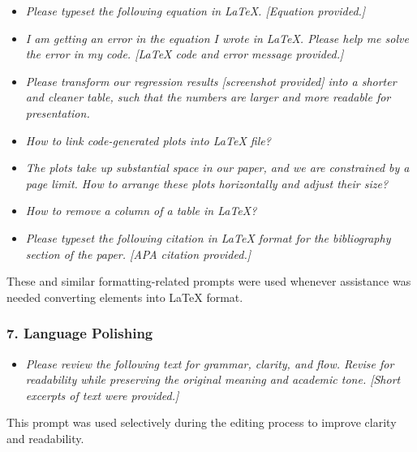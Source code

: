 \documentclass[12pt, a4paper]{article}
\begin{document}
\begin{itemize}
\item \textit{Please typeset the following equation in LaTeX. [Equation provided.]}

\item \textit{I am getting an error in the equation I wrote in LaTeX. Please help me solve the error in my code. [LaTeX code and error message provided.]}

\item \textit{Please transform our regression results [screenshot provided] into a shorter and cleaner table, such that the numbers are larger and more readable for presentation.}

\item \textit{How to link code-generated plots into LaTeX file?}

\item \textit{The plots take up substantial space in our paper, and we are constrained by a page limit. How to arrange these plots horizontally and adjust their size?}

\item \textit{How to remove a column of a table in LaTeX?}
\item \textit{Please typeset the following citation in LaTeX format for the bibliography section of the paper. [APA citation provided.]}
\end{itemize}

These and similar formatting-related prompts were used whenever assistance was needed converting elements into LaTeX format.

\subsubsection*{7. Language Polishing}

\begin{itemize}
\item \textit{Please review the following text for grammar, clarity, and flow. Revise for readability while preserving the original meaning and academic tone. [Short excerpts of text were provided.]}
\end{itemize}

This prompt was used selectively during the editing process to improve clarity and readability.
\end{document}
